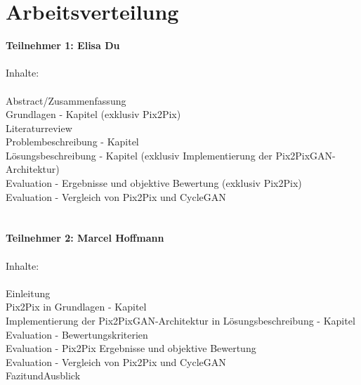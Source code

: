 \chapter*{Arbeitsverteilung}

\textbf{Teilnehmer 1:  Elisa Du} \\
\\
 Inhalte: \\
\\ Abstract/Zusammenfassung
\\ Grundlagen - Kapitel (exklusiv Pix2Pix)
\\ Literaturreview
\\ Problembeschreibung - Kapitel
\\ Lösungsbeschreibung - Kapitel (exklusiv Implementierung der Pix2PixGAN-Architektur)
\\ Evaluation - Ergebnisse und objektive Bewertung  (exklusiv Pix2Pix)
\\ Evaluation - Vergleich von Pix2Pix und CycleGAN
\\
\\
\\
\textbf{Teilnehmer 2: Marcel Hoffmann} \\
\\
 Inhalte: \\
\\ Einleitung
\\ Pix2Pix in Grundlagen - Kapitel
\\ Implementierung der Pix2PixGAN-Architektur in Lösungsbeschreibung - Kapitel
\\ Evaluation - Bewertungskriterien
\\ Evaluation - Pix2Pix Ergebnisse und objektive Bewertung
\\ Evaluation - Vergleich von Pix2Pix und CycleGAN
\\ FazitundAusblick
\\
\\
\\

